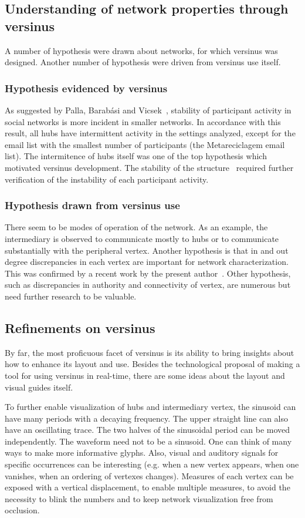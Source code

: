 \subsection{Understanding of network properties through versinus}
A number of hypothesis were drawn about networks, for which versinus
was designed. Another number of hypothesis were driven from versinus use itself.

\subsubsection{Hypothesis evidenced by versinus}
As suggested by Palla, Barab\'asi and Vicsek~\cite{barabasiEvo}, stability of participant activity in social networks is more incident in smaller networks. In accordance with this result, all hubs have intermittent activity in the settings analyzed, except for the email list with the smallest number of participants (the Metareciclagem email list). The intermitence of hubs itself was one of the top hypothesis which motivated versinus development. The stability of the structure~\cite{evoSN} required further verification of the instability of each participant activity.

\subsubsection{Hypothesis drawn from versinus use}
There seem to be modes of operation of the network. As an example, the intermediary is observed to communicate mostly to hubs or to communicate substantially with the peripheral vertex. Another hypothesis is that in and out degree discrepancies in each vertex are important for network characterization. This was confirmed by a recent work by the present author~\cite{evoSN}. Other hypothesis, such as discrepancies in authority and connectivity of vertex, are numerous but need further research to be valuable.
 
\subsection{Refinements on versinus}\label{sec:verref}
By far, the most proficuous facet of versinus is its ability
to bring insights about how to enhance its layout and use.
Besides the technological proposal of making a tool for using versinus
in real-time, there are some ideas about the layout and visual guides itself. 

To further enable visualization of hubs and intermediary vertex,
the sinusoid can have many periods 
with a decaying frequency.
The upper straight line can also have an oscillating trace.
The two halves of the sinusoidal period can be moved independently.
The waveform need not to be a sinusoid.
One can think of many ways to make more informative glyphs. Also, visual and auditory signals for specific occurrences can be interesting (e.g. when a new vertex appears, when one vanishes, when an ordering of vertexes changes).
Measures of each vertex can be exposed with a vertical displacement, to enable multiple measures, to avoid the necessity to blink the numbers and to keep network visualization free from occlusion.

